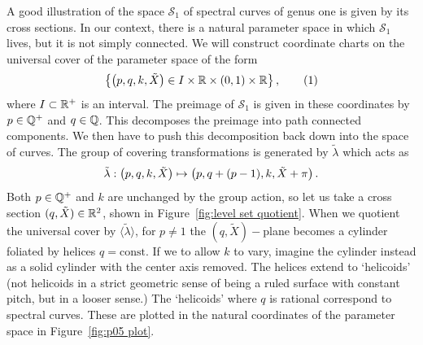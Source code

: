 \documentclass{article}
\begin{document}
A good illustration of the space $\mathcal{S}_1$ of spectral curves of genus one is given by its cross sections. In our context, there is a natural parameter space in which $\mathcal{S}_1$ lives, but it is not simply connected. We will construct coordinate charts on the universal cover of the parameter space of the form
\[
\left\{ \bra{p,q,k,\tilde{X}} \in I \times \R \times (0,1) \times \R \right\},
\labelthis{eqn:parameter demo}
\]
where $I\subset\mathbb{R}^+$ is an interval. The preimage of $\mathcal{S}_1$ is given in these coordinates by $p\in\mathbb{Q}^+$ and $q\in\mathbb{Q}$. 
This decomposes the preimage into path connected components. 
We then have to push this decomposition back down into the space of curves.
The group of covering transformations is generated by $\tilde{\lambda}$ which acts as
\[
\tilde{\lambda} : \left(p,q,k,\tilde{X}\right) \mapsto \left(p,q + (p-1),k,\tilde{X} + \pi\right).
\]
Both $p\in\mathbb{Q}^+$ and $k$ are unchanged by the group action, so let us take a cross section $(q,\tilde{X}) \in \mathbb{R}^2$, shown in Figure~\ref{fig:level set quotient}. When we quotient the universal cover by $\langle\tilde{\lambda}\rangle$, for $p\neq1$ the $(q,\tilde{X})-$plane becomes a cylinder foliated by helices $q=\text{const}$. If we to allow $k$ to vary, imagine the cylinder instead as a solid cylinder with the center axis removed. The helices extend to `helicoids' (not helicoids in a strict geometric sense of being a ruled surface with constant pitch, but in a looser sense.) The `helicoids' where $q$ is rational correspond to spectral curves. These are plotted in the natural coordinates of the parameter space in Figure~\ref{fig:p05 plot}.
\end{document}

